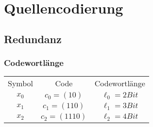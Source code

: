 \section{Quellencodierung}
\subsection{Redundanz}
\subsubsection{Codewortlänge}
\begin{center}
    \begin{tabular}{ c c c }
     Symbol & Code & Codewortlänge \\ 
     $x_0$ & $c_0 = (10)$ & $\ell_0 = 2 Bit$ \\  
     $x_1$ & $c_1 = (110)$ & $\ell_1 = 3 Bit$ \\   
     $x_2$ & $c_2 = (1110)$ & $\ell_2 = 4 Bit$  
    \end{tabular}
    \end{center}